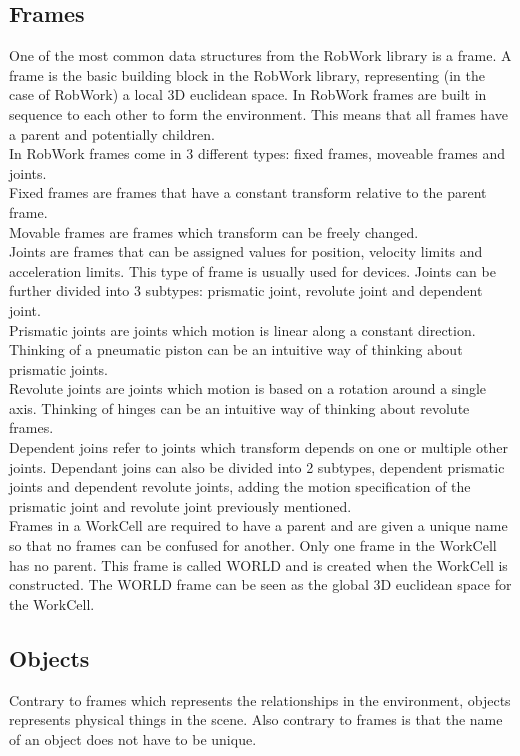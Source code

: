 \subsection{Frames}
One of the most common data structures from the RobWork library is a frame. A frame is the basic building block in the RobWork library, representing (in the case of RobWork) a local 3D euclidean space. In RobWork frames are built in sequence to each other to form the environment. This means that all frames have a parent and potentially children.\\

In RobWork frames come in 3 different types: fixed frames, moveable frames and joints.\\
Fixed frames are frames that have a constant transform relative to the parent frame.\\
Movable frames are frames which transform can be freely changed.\\
Joints are frames that can be assigned values for position, velocity limits and acceleration limits. This type of frame is usually used for devices. Joints can be further divided into 3 subtypes: prismatic joint, revolute joint and dependent joint.\\
Prismatic joints are joints which motion is linear along a constant direction. Thinking of a pneumatic piston can be an intuitive way of thinking about prismatic joints.\\
Revolute joints are joints which motion is based on a rotation around a single axis. Thinking of hinges can be an intuitive way of thinking about revolute frames.\\
Dependent joins refer to joints which transform depends on one or multiple other joints. Dependant joins can also be divided into 2 subtypes, dependent prismatic joints and dependent revolute joints, adding the motion specification of the prismatic joint and revolute joint previously mentioned.\\

Frames in a WorkCell are required to have a parent and are given a unique name so that no frames can be confused for another. Only one frame in the WorkCell has no parent. This frame is called WORLD and is created when the WorkCell is constructed. The WORLD frame can be seen as the global 3D euclidean space for the WorkCell.


\subsection{Objects}
Contrary to frames which represents the relationships in the environment, objects represents physical things in the scene. Also contrary to frames is that the name of an object does not have to be unique.\\

